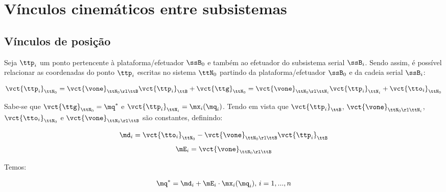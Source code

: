 \documentclass[]{politex}
\begin{document}
\section{Vínculos cinemáticos entre subsistemas} 


\subsection{Vínculos de posição} 

Seja $\ttp_i$ um ponto pertencente à plataforma/efetuador $\ssB_0$ e também ao efetuador do subsistema serial $\ssB_i$. Sendo assim, é possível relacionar as coordenadas do ponto $\ttp_i$ escritas no sistema $\ttN_0$ partindo da plataforma/efetuador $\ssB_0$ e da cadeia serial $\ssB_i$:

\begin{equation}
\vct{\ttp_i}_{\ttN_0} = \vct{\vone}_{\ttN_0 \rl \ttB} \vct{\ttp_i}_\ttB + \vct{\ttg}_{\ttN_0} = \vct{\vone}_{\ttN_0 \rl \ttN_i} \vct{\ttp_i}_{\ttN_i} + \vct{\tto_i}_{\ttN_0} 
\end{equation}

Sabe-se que $\vct{\ttg}_{\ttN_0} = \mq^\ast$ e $\vct{\ttp_i}_{\ttN_i} = \mx_i(\mq_i)$. Tendo em vista que $\vct{\ttp_i}_\ttB$, $\vct{\vone}_{\ttN_0 \rl \ttN_i}$, $\vct{\tto_i}_{\ttN_0}$ e $\vct{\vone}_{\ttN_0 \rl \ttB}$ são constantes, definindo:

\begin{equation}
\md_i = \vct{\tto_i}_{\ttN_0} -\vct{\vone}_{\ttN_0 \rl \ttB} \vct{\ttp_i}_\ttB
\end{equation}
\begin{equation}
\mE_i = \vct{\vone}_{\ttN_0 \rl \ttB}
\end{equation}

Temos:

\begin{equation}
\mq^\ast = \md_i + \mE_i \cdot \mx_i(\mq_i), \, i = 1,...,n
\end{equation}
\end{document}
